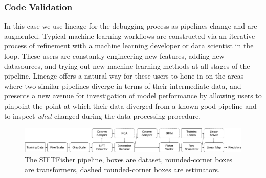 \documentclass{sig-alternate}
\begin{document}
\subsubsection{Code Validation}
In this case we use lineage for the debugging process as pipelines change and are augmented. 
Typical machine learning workflows are constructed via an iterative process of refinement with a machine learning developer or data scientist in the loop.
These users are constantly engineering new features, adding new datasources, and trying out new machine learning methods at all stages of the pipeline.
Lineage offers a natural way for these users to hone in on the areas where two similar pipelines diverge in terms of their intermediate data, and presents a new avenue for investigation of model performance by allowing users to pinpoint the point at which their data diverged from a known good pipeline and to inspect \emph{what} changed during the data processing procedure. 


\begin{figure}[t]
\begin{center}
    \includegraphics[width=150mm]{pictures/VOCSIFTFisher}
    \caption {The SIFTFisher pipeline, boxes are dataset, rounded-corner boxes are transformers, dashed rounded-corner boxes are estimators.
    \label{fig:vocsiftfisher}
}
\end{center}
\end{figure}
\end{document}
